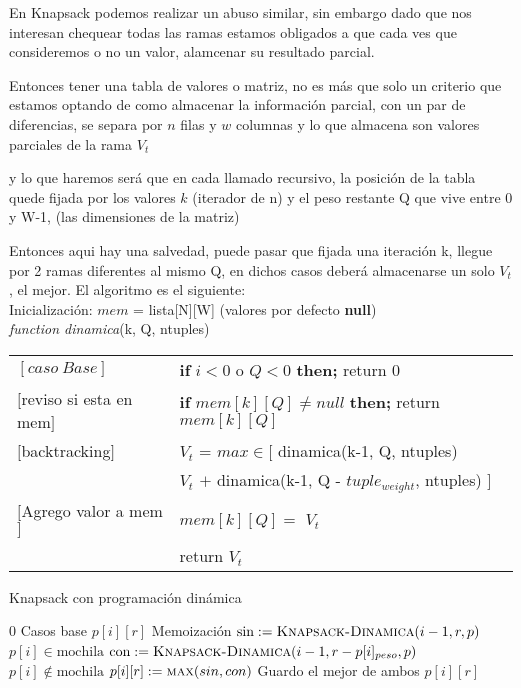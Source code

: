 \documentclass[fleqn, 11pt]{article}
\begin{document}
En Knapsack podemos realizar un abuso similar, sin embargo dado que nos interesan chequear todas las ramas estamos
obligados a que cada ves que consideremos o no un valor, alamcenar su resultado parcial.

Entonces tener una tabla de valores o matriz, no es más que solo un criterio que estamos optando de como almacenar
la información parcial, con un par de diferencias, se separa por $n$ filas y $w$ columnas y lo que almacena
son valores parciales de la rama \textit{$V_t$}

y lo que haremos será que en cada llamado recursivo, la posición de la tabla quede fijada por los valores $k$
(iterador de n) y el peso restante Q que vive entre 0 y W-1, (las dimensiones de la matriz)

Entonces aqui hay una salvedad, puede pasar que fijada una iteración k, llegue por 2 ramas diferentes al mismo Q,
en dichos casos deberá almacenarse un solo \textit{$V_t$}, el mejor. El algoritmo es el siguiente: \\

Inicialización: \quad \textit{$mem$} \quad = lista[N][W] (valores por defecto \textbf{null}) \\

\textit{function \quad dinamica}(k, Q, ntuples)


\begin{tabular}{l l}
    $[caso\ Base]$ & \textbf{if}  $i  <  0$ o  $Q  <  0$ \textbf{then;} return 0   \\
    $[$reviso si esta en mem$]$ & \textbf{if}  $mem[k][Q] \neq null$  \textbf{then;} return $mem[k][Q]$ \\
    $[$backtracking$]$ & \textit{$V_t$} = $ max \in  [ $  dinamica(k-1, Q, ntuples)  \\
    & \hspace{30pt} \textit{$V_t$} $ + $ dinamica(k-1, Q - $tuple_{weight}$, ntuples) $ ] $ \\
    $[$Agrego valor a mem$]$ &   $mem[k][Q] = $ \textit{$V_t$} \\
    & return \textit{$V_t$}

\end{tabular}

\begin{algorithm}
\caption{Knapsack con programación dinámica}
\begin{algorithmic}[1]
\State \Return $0$
\Comment Casos base
\EndIf
{}
\State	\Return $p[i][r]$
\Comment Memoización
\EndIf
\State $\text{sin} := \Call{Knapsack-Dinamica}{i - 1, r, p}$
\Comment $p[i] \in \text{mochila}$
\State $\text{con} := \Call{Knapsack-Dinamica}{i - 1, r - p[i]_{peso}, p}$
\Comment $p[i] \not\in \text{mochila}$
\State $p[i][r] := \Call{max}{sin, con}$
\Comment Guardo el mejor de ambos
\State \Return $p[i][r]$
\EndFunction
\end{algorithmic}
\end{algorithm}
\end{document}
